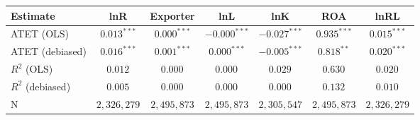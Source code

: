 \begin{tabular}{l*{6}{c}}
\hline\hline
 Estimate & lnR & Exporter & lnL & lnK & ROA & lnRL \\
\hline
ATET (OLS) & $0.013^{***}$ & $0.000^{***}$ & $-0.000^{***}$ & $-0.027^{***}$ & $0.935^{***}$ & $0.015^{***}$ \\
ATET (debiased) & $0.016^{***}$ & $0.001^{***}$ & $0.000^{***}$ & $-0.005^{***}$ & $0.818^{**}$ & $0.020^{***}$ \\
\addlinespace $ R^2$ (OLS) & $0.012^{}$ & $0.000^{}$ & $0.000^{}$ & $0.029^{}$ & $0.630^{}$ & $0.020^{}$ \\
$ R^2$ (debiased) & $0.005^{}$ & $0.000^{}$ & $0.000^{}$ & $0.000^{}$ & $0.132^{}$ & $0.010^{}$ \\
N & $2,326,279$ & $2,495,873$ & $2,495,873$ & $2,305,547$ & $2,495,873$ & $2,326,279$ \\
\hline\hline
\end{tabular}
